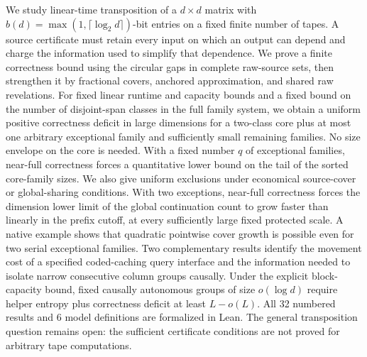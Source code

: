 We study linear-time transposition of a $d\times d$ matrix with
$b(d)=\max(1,\lceil\log_2d\rceil)$-bit entries on a fixed finite number of tapes.
A source certificate must retain every input on which an output can depend
and charge the information used to simplify that dependence.
We prove a finite correctness bound using the circular gaps in complete raw-source sets,
then strengthen it by fractional covers, anchored approximation, and shared raw revelations.
For fixed linear runtime and capacity bounds and a fixed bound on the
number of disjoint-span classes in the full family system, we obtain a
uniform positive correctness deficit in large dimensions for a two-class
core plus at most one arbitrary exceptional family and sufficiently small
remaining families. No size envelope on the core is needed.
With a fixed number $q$ of exceptional families, near-full correctness forces a
quantitative lower bound on the tail of the sorted core-family sizes.
We also give uniform exclusions under economical source-cover or global-sharing conditions.
With two exceptions, near-full correctness forces the dimension lower limit
of the global continuation count to grow faster than linearly in the prefix
cutoff, at every sufficiently large fixed protected scale.
A native example shows that quadratic pointwise cover growth is possible even for
two serial exceptional families. Two complementary results identify the movement cost
of a specified coded-caching query interface and the information needed to isolate
narrow consecutive column groups causally.
Under the explicit block-capacity bound, fixed causally autonomous groups
of size $o(\log d)$ require helper entropy plus correctness deficit at least $L-o(L)$.
All 32 numbered results and 6 model definitions are formalized in Lean.
The general transposition question remains open: the sufficient certificate conditions
are not proved for arbitrary tape computations.
